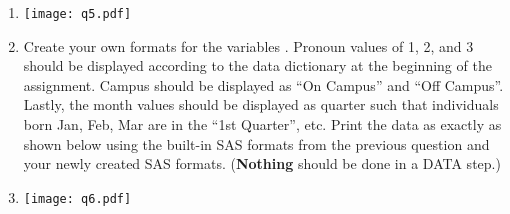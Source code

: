 \begin{enumerate}
\item[] \texttt{[image: q5.pdf]}
\item Create your own formats for the variables .  Pronoun values of 1, 2, and 3 should be displayed according to the data dictionary at the beginning of the assignment.  Campus should be displayed as ``On Campus'' and ``Off Campus''.  Lastly, the month values should be displayed as quarter such that individuals born Jan, Feb, Mar are in the ``1st Quarter'', etc.  Print the data as exactly as shown below using the built-in SAS formats from the previous question and your newly created SAS formats.  (\textbf{Nothing} should be done in a DATA step.)
\item[] \texttt{[image: q6.pdf]}
\end{enumerate}



 